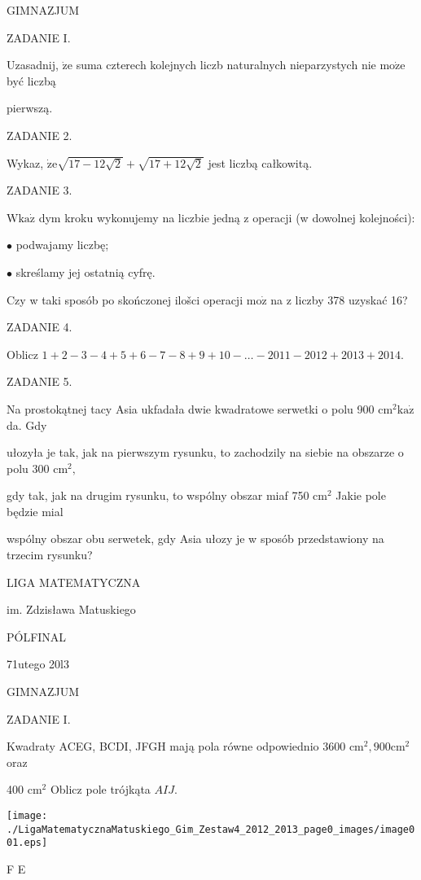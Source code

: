 \documentclass[a4paper,12pt]{article}
\begin{document}
GIMNAZJUM

ZADANIE I.

Uzasadnij, $\dot{\mathrm{z}}\mathrm{e}$ suma czterech kolejnych liczb naturalnych nieparzystych nie $\mathrm{m}\mathrm{o}\dot{\mathrm{z}}\mathrm{e}$ być liczbą

pierwszą.

ZADANIE 2.

Wykaz, $\dot{\mathrm{z}}\mathrm{e}\sqrt{17-12\sqrt{2}}+\sqrt{17+12\sqrt{2}}$ jest liczbą całkowitą.

ZADANIE 3.

$\mathrm{W}\mathrm{k}\mathrm{a}\dot{\mathrm{z}}$ dym kroku wykonujemy na liczbie jedną z operacji (w dowolnej kolejności):

$\bullet$ podwajamy liczbę;

$\bullet$ skreślamy jej ostatnią cyfrę.

Czy w taki sposób po skończonej ilošci operacji $\mathrm{m}\mathrm{o}\dot{\mathrm{z}}$ na z liczby 378 uzyskać 16?

ZADANIE 4.

Oblicz $1+2-3-4+5+6-7-8+9+10-\ldots-2011-2012+2013+2014.$

ZADANIE 5.

Na prostokątnej tacy Asia ukfadała dwie kwadratowe serwetki o polu 900 $\mathrm{c}\mathrm{m}^{2} \mathrm{k}\mathrm{a}\dot{\mathrm{z}}$ da. Gdy

ułozyła je tak, jak na pierwszym rysunku, to zachodzily na siebie na obszarze o polu 300 $\mathrm{c}\mathrm{m}^{2},$

gdy tak, jak na drugim rysunku, to wspólny obszar miaf 750 $\mathrm{c}\mathrm{m}^{2}$ Jakie pole będzie mial

wspólny obszar obu serwetek, gdy Asia ułozy je w sposób przedstawiony na trzecim rysunku?






LIGA MATEMATYCZNA

im. Zdzisława Matuskiego

PÓLFINAL

71utego 20l3

GIMNAZJUM

ZADANIE I.

Kwadraty ACEG, BCDI, JFGH mają pola równe odpowiednio 3600 $\mathrm{c}\mathrm{m}^{2}, 900 \mathrm{c}\mathrm{m}^{2}$ oraz

400 $\mathrm{c}\mathrm{m}^{2}$ Oblicz pole trójkąta $AIJ.$
\begin{center}
\texttt{[image: ./LigaMatematycznaMatuskiego\_Gim\_Zestaw4\_2012\_2013\_page0\_images/image001.eps]}
\end{center}
F  E
\end{document}
